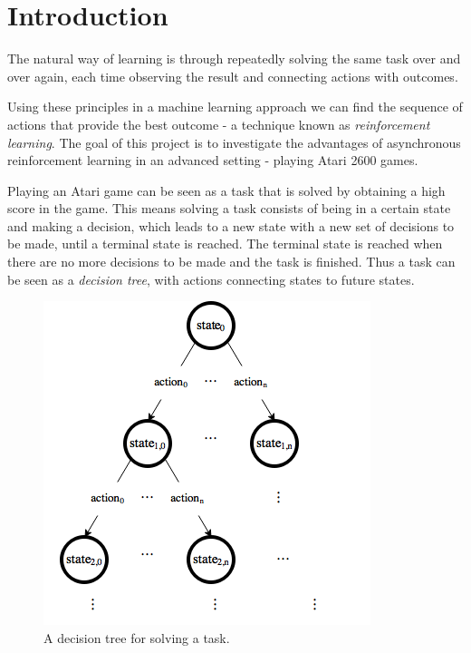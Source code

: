 \documentclass[11pt]{article}
\begin{document}
\maketitle

\section{Introduction}

The natural way of learning is through repeatedly solving the same
task over and over again, each time observing the result and connecting
actions with outcomes.

Using these principles in a machine learning approach
we can find the sequence of actions that provide the best outcome - a technique known as
\textit{reinforcement learning}.
The goal of this project is to investigate the advantages of asynchronous reinforcement
learning in an advanced setting - playing Atari 2600 games\cite{openAIEnvs}.

Playing an Atari game can be seen as a task that is solved by obtaining 
a high score in the game.
This means solving a task consists of being in a certain state and making a decision,
which leads to a new state with a new set of decisions to be made, until
a terminal state is reached.
The terminal state is reached when there are no more decisions to be made
and the task is finished.
Thus a task can be seen as a \textit{decision tree}, with actions connecting states to future states.
\begin{figure}[H]
    \centering
    \includegraphics[scale=0.5]{include/decision_tree.png}
    \caption{A decision tree for solving a task.}
    \label{fig:dec_tree}
\end{figure}
\end{document}
